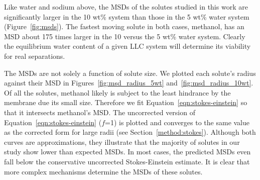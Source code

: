 \documentclass[journal=jpcbfk,manuscript=article]{achemso}
\begin{document}
  Like water and sodium above, the MSDs of the solutes studied in this work are 
  significantly larger in the 10 wt\% system than those in the 5 wt\% water 
  system (Figure~\ref{fig:msds}). The fastest moving solute in both cases, 
  methanol, has an MSD about 175 times larger in the 10 versus the 5 wt\%
  water system. Clearly the equilibrium water content of a given LLC system will 
  determine its viability for real separations.  %
  
  The MSDs are not solely a function of solute size. We plotted each solute's radius
  against their MSD in Figures~\ref{fig:msd_radius_5wt} and~\ref{fig:msd_radius_10wt}.
  Of all the solutes, %
  methanol 
  likely
  is subject to the least hindrance by
  the membrane due its small size. Therefore we fit Equation~\ref{eqn:stokes-einstein}
  so that it intersects methanol's MSD. 
  The uncorrected version of 
  Equation~\ref{eqn:stokes-einstein} ($f$=1) is plotted and converges to the same value as the
  corrected form for large radii (see Section~\ref{method:stokes}). Although both curves are 
  approximations, they illustrate that the majority of solutes in our study show
  lower than expected MSDs. In most cases, the predicted MSDs even fall below the 
  conservative uncorrected Stokes-Einstein estimate. It is clear that more complex
  mechanisms determine the MSDs of these solutes.
  
\end{document}
